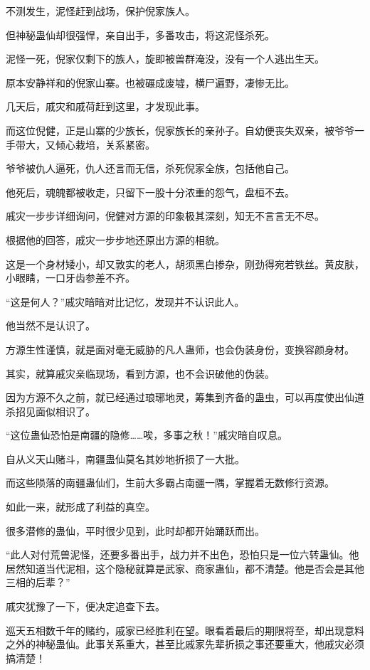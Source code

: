 \begin{this_body}
不测发生，泥怪赶到战场，保护倪家族人。

但神秘蛊仙却很强悍，亲自出手，多番攻击，将这泥怪杀死。

泥怪一死，倪家仅剩下的族人，旋即被兽群淹没，没有一个人逃出生天。

原本安静祥和的倪家山寨。也被碾成废墟，横尸遍野，凄惨无比。

几天后，戚灾和戚荷赶到这里，才发现此事。

而这位倪健，正是山寨的少族长，倪家族长的亲孙子。自幼便丧失双亲，被爷爷一手带大，又倾心栽培，关系紧密。

爷爷被仇人逼死，仇人还言而无信，杀死倪家全族，包括他自己。

他死后，魂魄都被收走，只留下一股十分浓重的怨气，盘桓不去。

戚灾一步步详细询问，倪健对方源的印象极其深刻，知无不言言无不尽。

根据他的回答，戚灾一步步地还原出方源的相貌。

这是一个身材矮小，却又敦实的老人，胡须黑白掺杂，刚劲得宛若铁丝。黄皮肤，小眼睛，一口牙齿参差不齐。

“这是何人？”戚灾暗暗对比记忆，发现并不认识此人。

他当然不是认识了。

方源生性谨慎，就是面对毫无威胁的凡人蛊师，也会伪装身份，变换容颜身材。

其实，就算戚灾亲临现场，看到方源，也不会识破他的伪装。

因为方源不久之前，就已经通过琅琊地灵，筹集到齐备的蛊虫，可以再度使出仙道杀招见面似相识了。

“这位蛊仙恐怕是南疆的隐修……唉，多事之秋！”戚灾暗自叹息。

自从义天山赌斗，南疆蛊仙莫名其妙地折损了一大批。

而这些陨落的南疆蛊仙们，生前大多霸占南疆一隅，掌握着无数修行资源。

如此一来，就形成了利益的真空。

很多潜修的蛊仙，平时很少见到，此时却都开始踊跃而出。

“此人对付荒兽泥怪，还要多番出手，战力并不出色，恐怕只是一位六转蛊仙。他居然知道当代泥相，这个隐秘就算是武家、商家蛊仙，都不清楚。他是否会是其他三相的后辈？”

戚灾犹豫了一下，便决定追查下去。

巡天五相数千年的赌约，戚家已经胜利在望。眼看着最后的期限将至，却出现意料之外的神秘蛊仙。此事关系重大，甚至比戚家先辈折损之事还要重大，他戚灾必须搞清楚！


\end{this_body}

